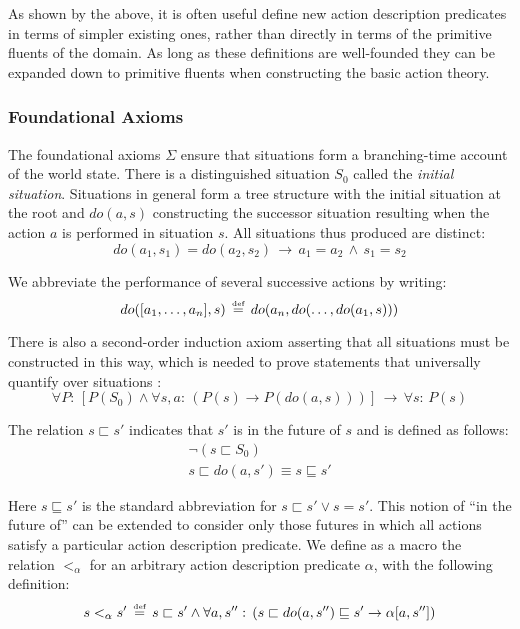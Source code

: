 As shown by the above, it is often useful define new action description
predicates in terms of simpler existing ones, rather than directly
in terms of the primitive fluents of the domain. As long as these
definitions are well-founded they can be expanded down to primitive
fluents when constructing the basic action theory.


\subsubsection{Foundational Axioms}

The foundational axioms $\Sigma$ ensure that situations form a branching-time
account of the world state. There is a distinguished situation $S_{0}$
called the \emph{initial situation}. Situations in general form a
tree structure with the initial situation at the root and $do(a,s)$
constructing the successor situation resulting when the action $a$
is performed in situation $s$. All situations thus produced are distinct:\[
do(a_{1},s_{1})=do(a_{2},s_{2})\,\rightarrow\, a_{1}=a_{2}\,\wedge\, s_{1}=s_{2}\]


We abbreviate the performance of several successive actions by writing:\[
do([a_{1},\dots,a_{n}],s)\,\stackrel{\mbox{\tiny def}}{=}\, do(a_{n},do(\dots,do(a_{1},s)))\]


There is also a second-order induction axiom asserting that all situations
must be constructed in this way, which is needed to prove statements
that universally quantify over situations \citep{Reiter93proving}:\[
\forall P:\,\left[P(S_{0})\wedge\forall s,a:\,\left(P(s)\rightarrow P(do(a,s))\right)\right]\,\rightarrow\,\forall s:\, P(s)\]


The relation $s\sqsubset s'$ indicates that $s'$ is in the future
of $s$ and is defined as follows:\begin{gather*}
\neg(s\sqsubset S_{0})\\
s\sqsubset do(a,s')\equiv s\sqsubseteq s'\end{gather*}


Here $s\sqsubseteq s'$ is the standard abbreviation for $s\sqsubset s'\vee s=s'$.
This notion of {}``in the future of'' can be extended to consider
only those futures in which all actions satisfy a particular action
description predicate. We define as a macro the relation $<_{\alpha}$
for an arbitrary action description predicate $\alpha$, with the
following definition:\[
s<_{\alpha}s'\,\stackrel{\mbox{\tiny def}}{=}\, s\sqsubset s'\wedge\forall a,s'':\,\left(s\sqsubset do(a,s'')\sqsubseteq s'\rightarrow\alpha[a,s'']\right)\]


